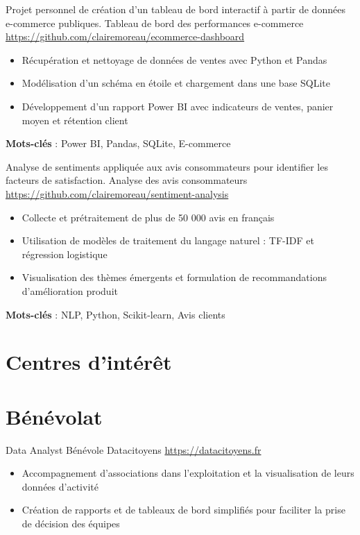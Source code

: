 \documentclass[a4paper, serif, 10pt]{moderncv}
\begin{document}
        {Projet personnel de création d'un tableau de bord interactif à partir de données e-commerce publiques.}
        {Tableau de bord des performances e-commerce}
        {\url{https://github.com/clairemoreau/ecommerce-dashboard}}
        {}
        {\begin{itemize}
\item Récupération et nettoyage de données de ventes avec Python et Pandas
\item Modélisation d'un schéma en étoile et chargement dans une base SQLite
\item Développement d'un rapport Power BI avec indicateurs de ventes, panier moyen et rétention client
\end{itemize}
\textbf{Mots-clés} : Power BI, Pandas, SQLite, E-commerce}

        {Analyse de sentiments appliquée aux avis consommateurs pour identifier les facteurs de satisfaction.}
        {Analyse des avis consommateurs}
        {\url{https://github.com/clairemoreau/sentiment-analysis}}
        {}
        {\begin{itemize}
\item Collecte et prétraitement de plus de 50 000 avis en français
\item Utilisation de modèles de traitement du langage naturel : TF-IDF et régression logistique
\item Visualisation des thèmes émergents et formulation de recommandations d'amélioration produit
\end{itemize}
\textbf{Mots-clés} : NLP, Python, Scikit-learn, Avis clients}
\section{Centres d'intérêt}

\section{Bénévolat}

        {Data Analyst Bénévole}
        {Datacitoyens}
        {\url{https://datacitoyens.fr}}
        {}
        {\begin{itemize}
\item Accompagnement d'associations dans l'exploitation et la visualisation de leurs données d'activité
\item Création de rapports et de tableaux de bord simplifiés pour faciliter la prise de décision des équipes
\end{itemize}}
\end{document}
